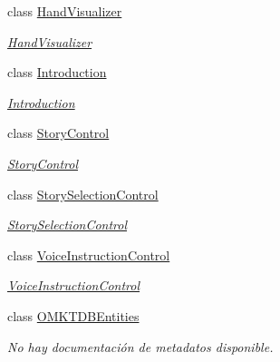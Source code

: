 \begin{DoxyCompactItemize}
class \hyperlink{class_microsoft_1_1_samples_1_1_kinect_1_1_basic_interactions_1_1_hand_visualizer}{Hand\-Visualizer}
\begin{DoxyCompactList}\small\item\em \hyperlink{class_microsoft_1_1_samples_1_1_kinect_1_1_basic_interactions_1_1_hand_visualizer}{Hand\-Visualizer} \end{DoxyCompactList}\item 
class \hyperlink{class_microsoft_1_1_samples_1_1_kinect_1_1_basic_interactions_1_1_introduction}{Introduction}
\begin{DoxyCompactList}\small\item\em \hyperlink{class_microsoft_1_1_samples_1_1_kinect_1_1_basic_interactions_1_1_introduction}{Introduction} \end{DoxyCompactList}\item 
class \hyperlink{class_microsoft_1_1_samples_1_1_kinect_1_1_basic_interactions_1_1_story_control}{Story\-Control}
\begin{DoxyCompactList}\small\item\em \hyperlink{class_microsoft_1_1_samples_1_1_kinect_1_1_basic_interactions_1_1_story_control}{Story\-Control} \end{DoxyCompactList}\item 
class \hyperlink{class_microsoft_1_1_samples_1_1_kinect_1_1_basic_interactions_1_1_story_selection_control}{Story\-Selection\-Control}
\begin{DoxyCompactList}\small\item\em \hyperlink{class_microsoft_1_1_samples_1_1_kinect_1_1_basic_interactions_1_1_story_selection_control}{Story\-Selection\-Control} \end{DoxyCompactList}\item 
class \hyperlink{class_microsoft_1_1_samples_1_1_kinect_1_1_basic_interactions_1_1_voice_instruction_control}{Voice\-Instruction\-Control}
\begin{DoxyCompactList}\small\item\em \hyperlink{class_microsoft_1_1_samples_1_1_kinect_1_1_basic_interactions_1_1_voice_instruction_control}{Voice\-Instruction\-Control} \end{DoxyCompactList}\item 
class \hyperlink{class_microsoft_1_1_samples_1_1_kinect_1_1_basic_interactions_1_1_o_m_k_t_d_b_entities}{O\-M\-K\-T\-D\-B\-Entities}
\begin{DoxyCompactList}\small\item\em No hay documentación de metadatos disponible. \end{DoxyCompactList}\item 

\end{DoxyCompactItemize}
